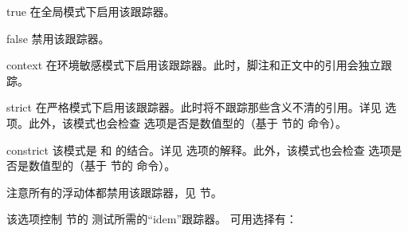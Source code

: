 \begin{optionlist}
\begin{valuelist}
\item[true] %
在全局模式下启用该跟踪器。
\item[false] %
禁用该跟踪器。
\item[context] %
在环境敏感模式下启用该跟踪器。此时，脚注和正文中的引用会独立跟踪。
\item[strict] %
在严格模式下启用该跟踪器。此时将不跟踪那些含义不清的引用。详见  选项。此外，该模式也会检查  选项是否是数值型的（基于  节的  命令）。
\item[constrict] %
该模式是  和  的结合。详见   选项的解释。此外，该模式也会检查  选项是否是数值型的（基于  节的  命令）。
\end{valuelist}

注意所有的浮动体都禁用该跟踪器，见  节。


该选项控制  节的  测试所需的“idem”跟踪器。
可用选择有：


\end{optionlist}
